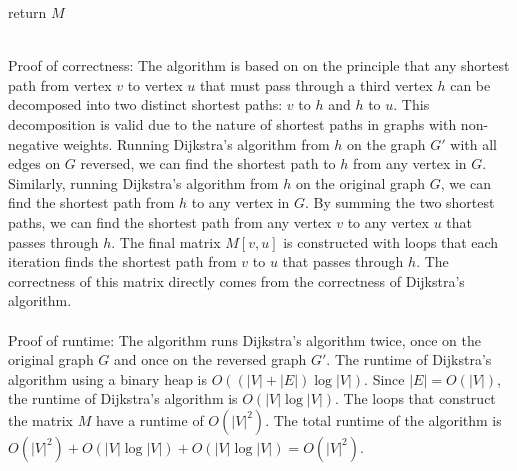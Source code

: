 \documentclass[10pt]{article}
\begin{document}
\begin{solution}
\begin{algorithm}
\begin{algorithmic}[1]
            \State return $M$
        \EndFunction
        \end{algorithmic}
    \end{algorithm} \\
    Proof of correctness:  The algorithm is based on on the principle that any shortest path from vertex $
    v$ to vertex $u$ that must pass through a third vertex $h$ can be decomposed into two distinct shortest paths: $v$ to $h$ and $h$ to $u$. This decomposition is valid due to the nature of shortest paths in graphs with non-negative weights.
    Running Dijkstra's algorithm from $h$ on the graph $G'$ with all edges on $G$ reversed, we can find the shortest path to $h$ from any vertex in $G$. Similarly, running Dijkstra's algorithm from $h$ on the original graph $G$, we can find the shortest path from $h$ to any vertex in $G$. 
    By summing the two shortest paths, we can find the shortest path from any vertex $v$ to any vertex $u$ that passes through $h$. The final matrix $M[v, u]$ is constructed with loops that each iteration finds the shortest path from $v$ to $u$ that passes through $h$. The correctness of this matrix 
    directly comes from the correctness of Dijkstra's algorithm. \\
    \\
    Proof of runtime: The algorithm runs Dijkstra's algorithm twice, once on the original graph $G$ and once on the reversed graph $G'$. The runtime of Dijkstra's algorithm using a binary heap is $O((|V|+|E|)\log|V|)$. Since $|E| = O(|V|)$, the runtime of Dijkstra's algorithm is $O(|V|\log|V|)$. The loops that construct the matrix $M$ have a runtime of $O(|V|^2)$. The total runtime of the algorithm is $O(|V|^2) + O(|V|\log|V|) + O(|V|\log|V|) = O(|V|^2)$.
\end{solution}

\newpage

\end{document}
